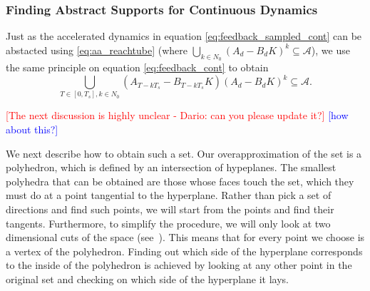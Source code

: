 \documentclass[twocolumn]{autart}    %
\newcommand{\mat}[1]{{#1}}
\begin{document}
 \subsubsection{Finding Abstract Supports for Continuous Dynamics}
 \label{sec:cont_aasup}



Just as the accelerated dynamics in equation \eqref{eq:feedback_sampled_cont} can be abstacted using \eqref{eq:aa_reachtube} (where $\bigcup_{k \in N_0} (\mat{A}_d-\mat{B}_d\mat{K}) ^k \subseteq \mathcal{A}$),
we use the same principle on equation \eqref{eq:feedback_cont} to obtain 
\begin{equation}\label{eq:aa_cont_amatrix}
\bigcup_{T \in [0, T_s], k \in N_0} (\mat{A}_{T-kT_s}-\mat{B}_{T-kT_s}\mat{K}) (\mat{A}_d-\mat{B}_d\mat{K})^k \subseteq \mathcal{A}.
\end{equation}

\textcolor{red}{[The next discussion is highly unclear - Dario: can you please update it?]}
\textcolor{blue}{[how about this?]}

We next describe how to obtain such a set. 
Our overapproximation of the set is a polyhedron, which is defined by an
intersection of hypeplanes. The smallest polyhedra that can be obtained are
those whose faces touch the set, which they must do at a point tangential to
the hyperplane. Rather than pick a set of directions and find such points, we
will start from the points and find their tangents. Furthermore, to simplify the
procedure, we will only look at two dimensional cuts of the space 
(see~\cite{cattaruzza2015unbounded}). This means that for every point we
choose is a vertex of the polyhedron.
Finding out which side of the hyperplane corresponds to the inside of the
polyhedron is achieved by looking at any other point in the original set and
checking on which side of the hyperplane it lays.

\end{document}
